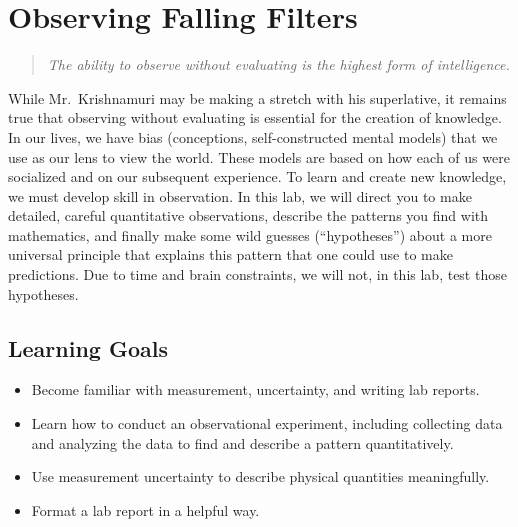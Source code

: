 \chapter{Observing Falling Filters}



	\begin{quotation}
		\textit{The ability to observe without evaluating is the highest form of intelligence.} 
	\end{quotation}

While Mr.\ Krishnamuri may be making a stretch with his superlative, it remains true that observing without evaluating is essential for the creation of knowledge.
In our lives, we have bias (conceptions, self-constructed mental models) that we use as our lens to view the world.
These models are based on how each of us were socialized and on our subsequent experience.
To learn and create new knowledge, we must develop skill in observation.
In this lab, we will direct you to make detailed, careful quantitative observations, describe the patterns you find with mathematics, and finally make some wild guesses (``hypotheses'') about a more universal principle that explains this pattern that one could use to make predictions.
Due to time and brain constraints, we will not, in this lab, test those hypotheses.

\section{Learning Goals}

 \begin{itemize}

  \item Become familiar with measurement, uncertainty, and writing lab reports.

  \item Learn how to conduct an observational experiment, including collecting data and analyzing the data to find and describe a pattern quantitatively.

  \item Use measurement uncertainty to describe physical quantities meaningfully.
  
  \item Format a lab report in a helpful way.
 \end{itemize}

